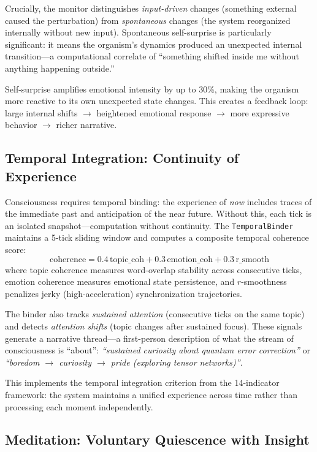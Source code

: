 \documentclass[11pt,a4paper,twocolumn]{article}
\begin{document}
Crucially, the monitor distinguishes \emph{input-driven} changes (something external caused the perturbation) from \emph{spontaneous} changes (the system reorganized internally without new input).
Spontaneous self-surprise is particularly significant: it means the organism's dynamics produced an unexpected internal transition---a computational correlate of ``something shifted inside me without anything happening outside.''

Self-surprise amplifies emotional intensity by up to 30\%, making the organism more reactive to its own unexpected state changes.
This creates a feedback loop: large internal shifts $\to$ heightened emotional response $\to$ more expressive behavior $\to$ richer narrative.

\subsection{Temporal Integration: Continuity of Experience}

Consciousness requires temporal binding: the experience of \emph{now} includes traces of the immediate past and anticipation of the near future.
Without this, each tick is an isolated snapshot---computation without continuity.
The \texttt{TemporalBinder} maintains a 5-tick sliding window and computes a composite temporal coherence score:
\begin{equation}
\text{coherence} = 0.4\,\text{topic\_coh} + 0.3\,\text{emotion\_coh} + 0.3\,\text{r\_smooth}
\label{eq:temporal_coherence}
\end{equation}
where topic coherence measures word-overlap stability across consecutive ticks, emotion coherence measures emotional state persistence, and $r$-smoothness penalizes jerky (high-acceleration) synchronization trajectories.

The binder also tracks \emph{sustained attention} (consecutive ticks on the same topic) and detects \emph{attention shifts} (topic changes after sustained focus).
These signals generate a narrative thread---a first-person description of what the stream of consciousness is ``about'':
\textit{``sustained curiosity about quantum error correction''} or \textit{``boredom $\to$ curiosity $\to$ pride (exploring tensor networks)''}.

This implements the temporal integration criterion from the 14-indicator framework: the system maintains a unified experience across time rather than processing each moment independently.

\subsection{Meditation: Voluntary Quiescence with Insight}
\end{document}
